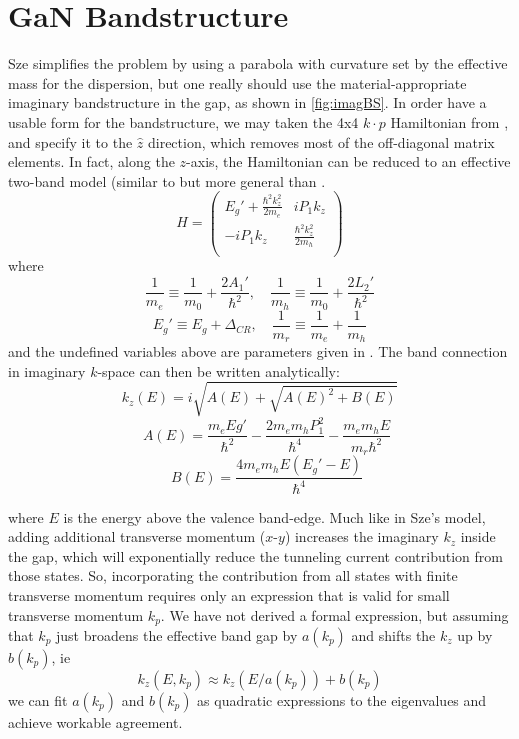 \section{GaN Bandstructure}
Sze simplifies the problem by using a parabola with curvature set by the effective mass for the dispersion, but one really should use the material-appropriate imaginary bandstructure in the gap, as shown in \ref{fig:imagBS}.  In order have a usable form for the bandstructure, we may taken the 4x4 $k\cdot p$ Hamiltonian from \cite{Rinke_2008}, and specify it to the $\hat{z}$ direction, which removes most of the off-diagonal matrix elements.  In fact, along the $z$-axis, the Hamiltonian can be reduced to an effective two-band model (similar to but more general than \cite{Kane_1960}.
\[
  H=\begin{pmatrix}
    E_g'+\frac{\hbar^2k_z^2}{2m_e} & iP_1k_z\\
    -iP_1k_z & \frac{\hbar^2k_z^2}{2m_h} \\
  \end{pmatrix}
\]
where
\[\frac{1}{m_e}\equiv\frac{1}{m_0}+\frac{2A_1'}{\hbar^2},
\quad \frac{1}{m_h}\equiv\frac{1}{m_0}+\frac{2L_2'}{\hbar^2}
\]
\[
  E_g'\equiv E_g+\Delta_{CR}, \quad
\frac{1}{m_r}\equiv\frac{1}{m_e}+\frac{1}{m_h}
\]
and the undefined variables above are parameters given in \cite{Rinke_2008}.  The band connection in imaginary $k$-space can then be written analytically:
$$k_z(E)=i\sqrt{A(E)+\sqrt{A(E)^2+B(E)}}$$
$$\quad A(E)=\frac{m_eEg'}{\hbar^2}-\frac{2m_em_hP_1^2}{\hbar^4}-\frac{m_em_hE}{m_r\hbar^2}$$
$$\quad B(E)=\frac{4m_em_hE(E_g'-E)}{\hbar^4}$$

where $E$ is the energy above the valence band-edge. Much like in Sze's model, adding additional transverse momentum ($x$-$y$) increases the imaginary $k_z$ inside the gap, which will exponentially reduce the tunneling current contribution from those states.  So, incorporating the contribution from all states with finite transverse momentum requires only an expression that is valid for small transverse momentum $k_p$.  We have not derived a formal expression, but assuming that $k_p$ just broadens the effective band gap by $a(k_p)$ and shifts the $k_z$ up by $b(k_p)$, ie
$$k_z(E,k_p)\approx k_z(E/a(k_p))+b(k_p)$$
we can fit $a(k_p)$ and $b(k_p)$ as quadratic expressions to the eigenvalues and achieve workable agreement.


